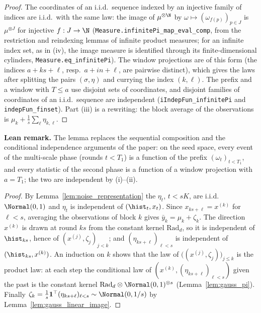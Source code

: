 \begin{proof}
\leanok
{}
The coordinates of an i.i.d.\ sequence indexed by an injective family of indices are
i.i.d.\ with the same law: the image of $\mu^{\otimes\N}$ by
$\omega \mapsto (\omega_{f(p)})_{p \in J}$ is $\mu^{\otimes J}$ for injective $f : J \to \N$
(\texttt{Measure.infinitePi\_map\_eval\_comp}, from the restriction and reindexing lemmas of
infinite product measures; for an infinite index set, as in (iv), the image measure is
identified through its finite-dimensional cylinders, \texttt{Measure.eq\_infinitePi}). The window projections are of this form (the indices
$a + ks + \ell$, resp.\ $a + in + \ell$, are pairwise distinct), which gives the laws after
splitting the pairs $(\sigma, \eta)$ and currying the index $(k, \ell)$. The prefix and a
window with $T \le a$ use disjoint sets of coordinates, and disjoint families of
coordinates of an i.i.d.\ sequence are independent (\texttt{iIndepFun\_infinitePi} and
\texttt{indepFun\_finset}). Part (iii) is a rewriting: the block average of the
observations is $\mu_k + \frac1s\sum_\ell \eta_{k,\ell}$.
\end{proof}

\textbf{Lean remark.} The lemma replaces the sequential composition and the conditional
independence arguments of the paper: on the seed space, every event of the multi-scale
phase (rounds $t < T_1$) is a function of the prefix $(\omega_t)_{t<T_1}$, and every
statistic of the second phase is a function of a window projection with $a = T_1$; the two
are independent by (i)--(ii).

\begin{proof}
By Lemma~\ref{lem:noise_representation} the $\eta_t$, $t < sK$, are i.i.d.\ $\Normal(0,1)$
and $\eta_t$ is independent of $(\hist_t, x_t)$. Since $x_{ks+\ell} = x^{(k)}$ for
$\ell < s$, averaging the observations of block $k$ gives $\bar y_k = \mu_k + \zeta_k$.
The direction $x^{(k)}$ is drawn at round $ks$ from the constant kernel $\mathrm{Rad}_d$, so
it is independent of $\hist_{ks}$, hence of $(x^{(j)}, \zeta_j)_{j<k}$; and
$(\eta_{ks+\ell})_{\ell<s}$ is independent of $(\hist_{ks}, x^{(k)})$. An induction on $k$
shows that the law of $\big((x^{(j)},\zeta_j)\big)_{j \le k}$ is the product law: at each
step the conditional law of $(x^{(k)}, (\eta_{ks+\ell})_{\ell<s})$ given the past is the
constant kernel $\mathrm{Rad}_d \otimes \Normal(0,1)^{\otimes s}$ (Lemma~\ref{lem:gauss_pi}).
Finally $\zeta_k = \frac1s\mathbf 1^\top(\eta_{ks+\ell})_{\ell<s} \sim \Normal(0, 1/s)$ by
Lemma~\ref{lem:gauss_linear_image}.
\end{proof}

